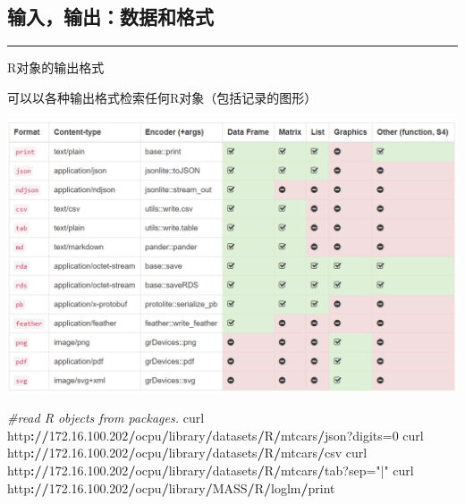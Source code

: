 \documentclass[]{book}
\newenvironment{Shaded}{\begin{snugshade}}{\end{snugshade}}
\newcommand{\DecValTok}[1]{\textcolor[rgb]{0.00,0.00,0.81}{#1}}
\newcommand{\FloatTok}[1]{\textcolor[rgb]{0.00,0.00,0.81}{#1}}
\newcommand{\StringTok}[1]{\textcolor[rgb]{0.31,0.60,0.02}{#1}}
\newcommand{\CommentTok}[1]{\textcolor[rgb]{0.56,0.35,0.01}{\textit{#1}}}
\newcommand{\OperatorTok}[1]{\textcolor[rgb]{0.81,0.36,0.00}{\textbf{#1}}}
\newcommand{\ErrorTok}[1]{\textcolor[rgb]{0.64,0.00,0.00}{\textbf{#1}}}
\newcommand{\NormalTok}[1]{#1}
\begin{document}
\subsection{输入，输出：数据和格式}

\begin{center}\rule{0.5\linewidth}{\linethickness}\end{center}

R对象的输出格式

可以以各种输出格式检索任何R对象（包括记录的图形）

\includegraphics{pic/opencpu/p7.png}

\begin{Shaded}
\begin{Highlighting}[]
\CommentTok{#read R objects from packages.}
\NormalTok{curl http}\OperatorTok{:}\ErrorTok{//}\FloatTok{172.16}\NormalTok{.}\FloatTok{100.202}\OperatorTok{/}\NormalTok{ocpu}\OperatorTok{/}\NormalTok{library}\OperatorTok{/}\NormalTok{datasets}\OperatorTok{/}\NormalTok{R}\OperatorTok{/}\NormalTok{mtcars}\OperatorTok{/}\NormalTok{json?digits=}\DecValTok{0}
\NormalTok{curl http}\OperatorTok{:}\ErrorTok{//}\FloatTok{172.16}\NormalTok{.}\FloatTok{100.202}\OperatorTok{/}\NormalTok{ocpu}\OperatorTok{/}\NormalTok{library}\OperatorTok{/}\NormalTok{datasets}\OperatorTok{/}\NormalTok{R}\OperatorTok{/}\NormalTok{mtcars}\OperatorTok{/}\NormalTok{csv}
\NormalTok{curl http}\OperatorTok{:}\ErrorTok{//}\FloatTok{172.16}\NormalTok{.}\FloatTok{100.202}\OperatorTok{/}\NormalTok{ocpu}\OperatorTok{/}\NormalTok{library}\OperatorTok{/}\NormalTok{datasets}\OperatorTok{/}\NormalTok{R}\OperatorTok{/}\NormalTok{mtcars}\OperatorTok{/}\NormalTok{tab?sep=}\StringTok{"|"}
\NormalTok{curl http}\OperatorTok{:}\ErrorTok{//}\FloatTok{172.16}\NormalTok{.}\FloatTok{100.202}\OperatorTok{/}\NormalTok{ocpu}\OperatorTok{/}\NormalTok{library}\OperatorTok{/}\NormalTok{MASS}\OperatorTok{/}\NormalTok{R}\OperatorTok{/}\NormalTok{loglm}\OperatorTok{/}\NormalTok{print}
\end{Highlighting}
\end{Shaded}
\end{document}
